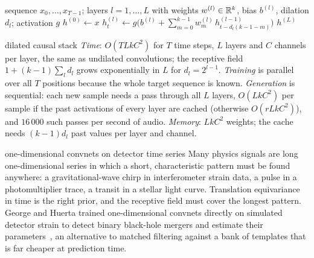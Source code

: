 \documentclass[11pt]{article}
\begin{document}
\begin{algorithm}[htbp]
\caption{Stack of dilated causal convolutions (one channel per layer for clarity)}\label{alg:dilated}
\begin{algorithmic}[1]
\Require sequence $x_0, \dots, x_{T-1}$; layers $l = 1, \dots, L$ with weights $w^{(l)} \in \mathbb{R}^k$, bias $b^{(l)}$,
  dilation $d_l$; activation $g$
  \State $h^{(0)} \gets x$
      \State $h^{(l)}_t \gets g\big(b^{(l)} + \sum_{m=0}^{k-1} w^{(l)}_m\, h^{(l-1)}_{t - d_l(k - 1 - m)}\big)$
    \EndFor
  \EndFor
  \State \Return $h^{(L)}$ 
\EndFunction
\end{algorithmic}
\end{algorithm}

\begin{runtime}{dilated causal stack}
\emph{Time}: $O(TLkC^2)$ for $T$ time steps, $L$ layers and $C$ channels per layer, the same as undilated convolutions;
the receptive field $1 + (k - 1)\sum_l d_l$ grows exponentially in $L$ for $d_l = 2^{l-1}$. \emph{Training} is parallel
over all $T$ positions because the whole target sequence is known. \emph{Generation} is sequential: each new sample needs a
pass through all $L$ layers, $O(LkC^2)$ per sample if the past activations of every layer are cached (otherwise
$O(rLkC^2)$), and $16\,000$ such passes per second of audio. \emph{Memory}: $LkC^2$ weights; the cache needs
$(k - 1)d_l$ past values per layer and channel.
\end{runtime}

\begin{physics}{one-dimensional convnets on detector time series}
Many physics signals are long one-dimensional series in which a short, characteristic pattern must be found anywhere:
a gravitational-wave chirp in interferometer strain data, a pulse in a photomultiplier trace, a transit in a stellar light
curve. Translation equivariance in time is the right prior, and the receptive field must cover the longest pattern. George and
Huerta trained one-dimensional convnets directly on simulated detector strain to detect binary black-hole mergers and
estimate their parameters~\cite{george2018}, an alternative to matched filtering against a bank of templates that is far
cheaper at prediction time.
\end{physics}
\end{document}
